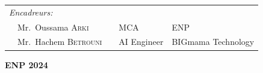 {\begin{titlepage}
\begin{flushleft}
\begin{tabular}{llcll}
            \\
            \textit{Encadreurs:}                                   &  &             &                    \\
            \multicolumn{2}{l}{~~Mr.\ Oussama \textsc{Arki}}       &  & MCA         & ENP                \\
            \multicolumn{2}{l}{~~Mr.\ Hachem \textsc{Betrouni}}    &  & AI Engineer & BIGmama Technology \\
        \end{tabular}
    \end{flushleft}

    \vspace*{7mm}
    \begin{center}
        \textbf{ENP 2024}
    \end{center}

\end{titlepage}
}